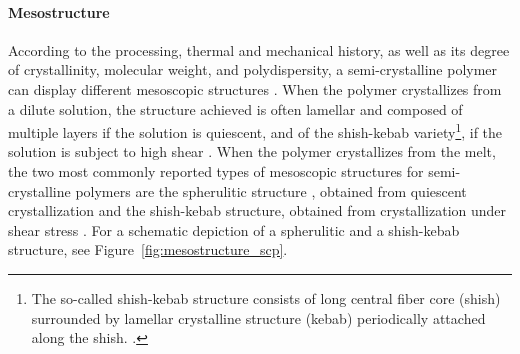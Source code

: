 \paragraph{Mesostructure}
According to the processing, thermal and mechanical history, as well as its degree of crystallinity, molecular weight, and polydispersity, a semi-crystalline polymer can display different mesoscopic structures \citep{cangemiTwoPhaseModelMechanical2001, mandelkernCrystallinePolymerReminiscences2006}.
When the polymer crystallizes from a dilute solution, the structure achieved is often lamellar and composed of multiple layers if the solution is quiescent, and of the shish-kebab variety\footnote{The so-called shish-kebab structure consists of long central fiber core (shish) surrounded by lamellar crystalline structure (kebab) periodically attached along the shish.
\citep{naViscousForceDominatedTensileDeformation2006, peacockHandbookPolyethyleneStructures2014}.}, if the solution is subject to high shear \citep{khouryMorphologyCrystallineSynthetic1976, callister2014materials, peacockHandbookPolyethyleneStructures2014}.
When the polymer crystallizes from the melt, the two most commonly reported types of mesoscopic structures for semi-crystalline polymers are the spherulitic structure \citep{zengConstitutiveModelSemicrystalline2010}, obtained from quiescent crystallization and the shish-kebab structure, obtained from crystallization under shear stress \citep{peacockHandbookPolyethyleneStructures2014}.
For a schematic depiction of a spherulitic and a shish-kebab structure, see Figure~\ref{fig:mesostructure_scp}.
